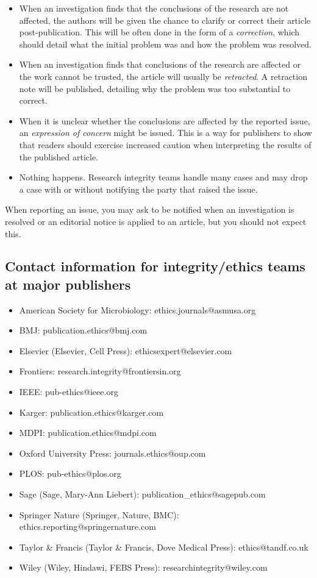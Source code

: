 \documentclass[letterpaper, 12pt]{article}
\begin{document}
\begin{itemize}
    \setlength\itemsep{-0.5em}
    \item When an investigation finds that the conclusions of the research are not affected, the authors will be given the chance to clarify or correct their article post-publication. This will be often done in the form of a \textit{correction}, which should detail what the initial problem was and how the problem was resolved.
    \item When an investigation finds that conclusions of the research are affected or the work cannot be trusted, the article will usually be \textit{retracted}. A retraction note will be published, detailing why the problem was too substantial to correct.
    \item When it is unclear whether the conclusions are affected by the reported issue, an \textit{expression of concern} might be issued. This is a way for publishers to show that readers should exercise increased caution when interpreting the results of the published article.
    \item Nothing happens. Research integrity teams handle many cases and may drop a case with or without notifying the party that raised the issue.
\end{itemize}

When reporting an issue, you may ask to be notified when an investigation is resolved or an editorial notice is applied to an article, but you should not expect this.

\pagebreak
\subsection*{Contact information for integrity/ethics teams at major publishers}

\begin{itemize}
    \setlength\itemsep{-0.5em}
    \item American Society for Microbiology: ethics.journals@asmusa.org
    \item BMJ: publication.ethics@bmj.com
    \item Elsevier (Elsevier, Cell Press): ethicsexpert@elsevier.com
    \item Frontiers: research.integrity@frontiersin.org
    \item IEEE: pub-ethics@ieee.org
    \item Karger: publication.ethics@karger.com
    \item MDPI: publication.ethics@mdpi.com
    \item Oxford University Press: journals.ethics@oup.com
    \item PLOS: pub-ethics@plos.org
    \item Sage (Sage, Mary-Ann Liebert): publication\_ethics@sagepub.com
    \item Springer Nature (Springer, Nature, BMC): ethics.reporting@springernature.com
    \item Taylor \& Francis (Taylor \& Francis, Dove Medical Press): ethics@tandf.co.uk
    \item Wiley (Wiley, Hindawi, FEBS Press): researchintegrity@wiley.com
\end{itemize}
\end{document}
